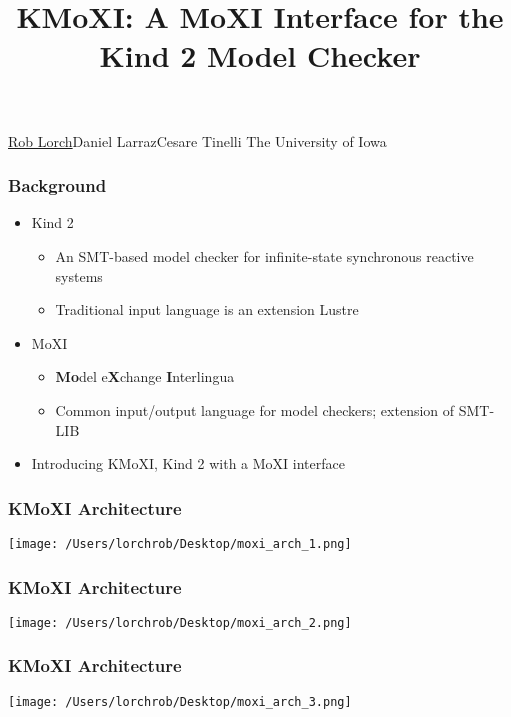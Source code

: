 \documentclass[11pt,xcolor={dvipsnames},hyperref={pdftex,pdfpagemode=UseNone,hidelinks,pdfdisplaydoctitle=true},usepdftitle=false]{beamer}
\begin{document}

\title{KMoXI: A MoXI Interface for the Kind 2 Model Checker}

\information
%  
%
{\underline{Rob Lorch}\quad Daniel Larraz\quad Cesare Tinelli
\newline \newline   
The University of Iowa
}
%

\frame{\titlepage}

\begin{frame} 
    \frametitle{Background}
    \begin{itemize}
        \item Kind 2
        \begin{itemize}
            \item An SMT-based model checker for infinite-state synchronous reactive systems
            \item Traditional input language is an extension Lustre
        \end{itemize}
        \pause
        \item MoXI
        \begin{itemize}
            \item \textbf{Mo}del e\textbf{X}change \textbf{I}nterlingua
            \item Common input/output language for model checkers; extension of SMT-LIB
        \end{itemize}
        \pause
        \item Introducing KMoXI, Kind 2 with a MoXI interface
    \end{itemize}
\end{frame}

\begin{frame} 
    \frametitle{KMoXI Architecture}
    \texttt{[image: /Users/lorchrob/Desktop/moxi\_arch\_1.png]}
\end{frame}

\begin{frame} 
    \frametitle{KMoXI Architecture}
    \texttt{[image: /Users/lorchrob/Desktop/moxi\_arch\_2.png]}
\end{frame}

\begin{frame} 
    \frametitle{KMoXI Architecture}
    \texttt{[image: /Users/lorchrob/Desktop/moxi\_arch\_3.png]}
\end{frame}
\end{document}
